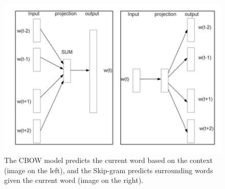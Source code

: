 \documentclass{article}
\begin{document}
\begin{figure}
 \begin{center}
 \includegraphics[scale=0.6]{w2vecModels.png} 
 \caption{ The CBOW model predicts the current word based on the
context (image on the left), and the Skip-gram predicts surrounding words given the current word (image on the right). } 
  \label{word2vecmodels}
  \end{center}
 \end{figure}
 
\end{document}
